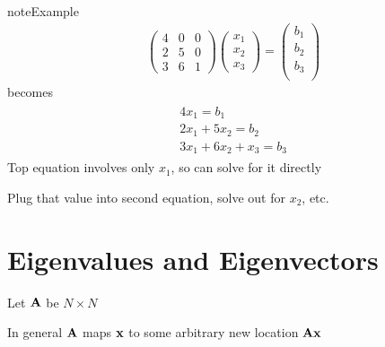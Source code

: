 \documentclass[letterpaper,10pt,english]{jupyterBook}
\begin{document}
\begin{sphinxadmonition}{note}{Example}
\begin{equation*}
\begin{split}
%
\left(
\begin{array}{ccc}
4 & 0 & 0 \\
2 & 5 & 0 \\
3 & 6 & 1
\end{array}
\right)
\left(
\begin{array}{ccc}
x_1 \\
x_2 \\
x_3 
\end{array}
\right)
=
\left(
\begin{array}{c}
b_1 \\
b_2 \\
b_3 \\
\end{array}
\right)
%
\end{split}
\end{equation*}
\sphinxAtStartPar
becomes
\begin{equation*}
\begin{split}
%
\begin{array}{c}
4x_1 = b_1 \\
2x_1 + 5x_2 = b_2 \\
3x_1 + 6x_2 + x_3 = b_3
\end{array}
%
\end{split}
\end{equation*}
\sphinxAtStartPar
Top equation involves only \(x_1\), so can solve for it directly
\end{sphinxadmonition}

\sphinxAtStartPar
Plug that value into second equation, solve out for \(x_2\), etc.


\section{Eigenvalues and Eigenvectors}
\label{\detokenize{05.linear_algebra:eigenvalues-and-eigenvectors}}
\sphinxAtStartPar
Let \({\bf A}\) be \(N \times N\)

\sphinxAtStartPar
In general \({\bf A}\) maps \({\bf x}\) to some arbitrary new location \({\bf A} {\bf x}\)
\end{document}
